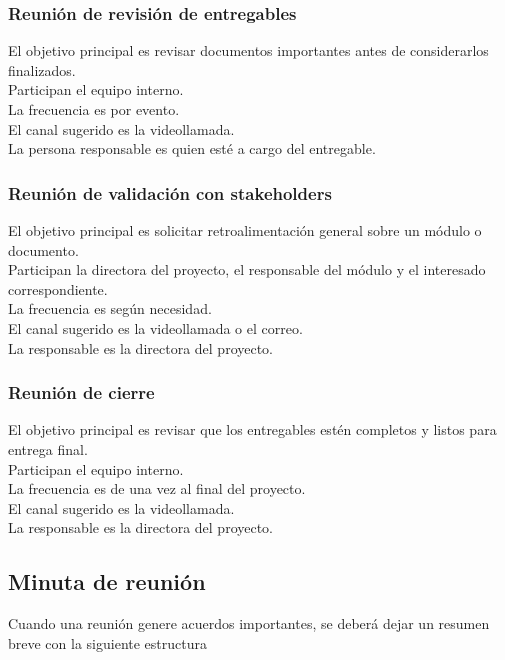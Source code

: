 \documentclass[11pt,spanish]{article}
\begin{document}
\subsubsection{Reunión de revisión de entregables}

\noindent El objetivo principal es revisar documentos importantes antes de considerarlos finalizados.\\
Participan el equipo interno.\\
La frecuencia es por evento.\\
El canal sugerido es la videollamada.\\
La persona responsable es quien esté a cargo del entregable.

\subsubsection{Reunión de validación con stakeholders}

\noindent El objetivo principal es solicitar retroalimentación general sobre un módulo o documento.\\
Participan la directora del proyecto, el responsable del módulo y el interesado correspondiente.\\
La frecuencia es según necesidad.\\
El canal sugerido es la videollamada o el correo.\\
La responsable es la directora del proyecto.

\subsubsection{Reunión de cierre}

\noindent El objetivo principal es revisar que los entregables estén completos y listos para entrega final.\\
Participan el equipo interno.\\
La frecuencia es de una vez al final del proyecto.\\
El canal sugerido es la videollamada.\\
La responsable es la directora del proyecto.

\subsection{Minuta de reunión}

Cuando una reunión genere acuerdos importantes, se deberá dejar un resumen breve con la siguiente estructura
\end{document}
